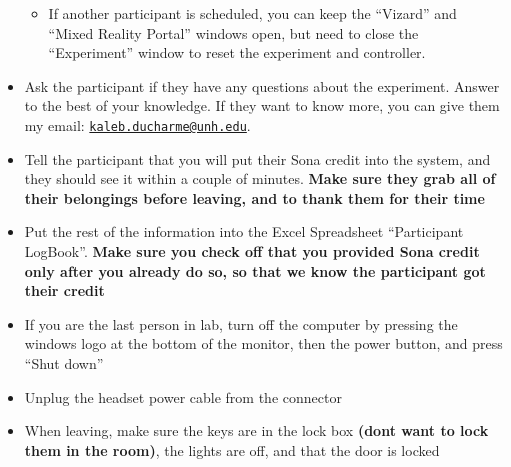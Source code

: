 \documentclass[
]{article}
\providecommand{\tightlist}{%
  \setlength{\itemsep}{0pt}\setlength{\parskip}{0pt}}
\begin{document}
\begin{itemize}
  \begin{itemize}
  \tightlist
  \item
    If another participant is scheduled, you can keep the ``Vizard'' and
    ``Mixed Reality Portal'' windows open, but need to close the
    ``Experiment'' window to reset the experiment and controller.
  \end{itemize}
\item
  Ask the participant if they have any questions about the experiment.
  Answer to the best of your knowledge. If they want to know more, you
  can give them my email:
  \href{mailto:kaleb.ducharme@unh.edu}{\nolinkurl{kaleb.ducharme@unh.edu}}.
\item
  Tell the participant that you will put their Sona credit into the
  system, and they should see it within a couple of minutes.
  \textbf{Make sure they grab all of their belongings before leaving,
  and to thank them for their time}
\item
  Put the rest of the information into the Excel Spreadsheet
  ``Participant LogBook''. \textbf{Make sure you check off that you
  provided Sona credit only after you already do so, so that we know the
  participant got their credit}
\item
  If you are the last person in lab, turn off the computer by pressing
  the windows logo at the bottom of the monitor, then the power button,
  and press ``Shut down''
\item
  Unplug the headset power cable from the connector
\item
  When leaving, make sure the keys are in the lock box \textbf{(dont
  want to lock them in the room)}, the lights are off, and that the door
  is locked
\end{itemize}
\end{document}
